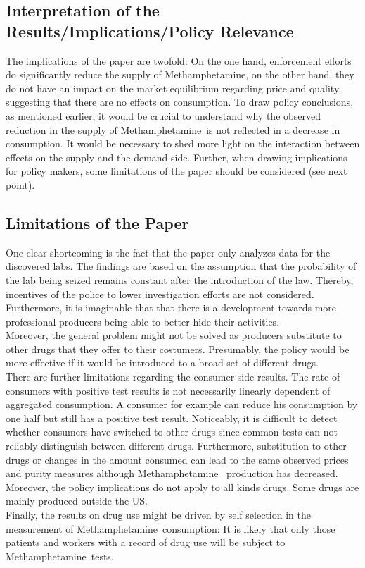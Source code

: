 \documentclass[%
  fontsize=11pt, %
  version=last,%
  headsepline,
  titlepage = false,
  DIV = 11, %
  abstract = false
]{scrartcl}
\newcommand{\meth}{Methamphetamine} %
\begin{document}
\subsection*{Interpretation of the Results/Implications/Policy Relevance}
The implications of the paper are twofold: On the one hand, enforcement efforts do significantly reduce the supply of \meth, on the other hand, they do not have an impact on the market equilibrium regarding price and quality, suggesting that there are no effects on consumption. To draw policy conclusions, as mentioned earlier, it would be crucial to understand why the observed reduction in the supply of \meth~is not reflected in a decrease in consumption. It would be necessary to shed more light on the interaction between effects on the supply and the demand side. Further, when drawing implications for policy makers, some limitations of the paper should be considered (see next point).

\subsection*{Limitations of the Paper}
One clear shortcoming is the fact that the paper only analyzes data for the discovered labs. The findings are based on the assumption that the probability of the lab being seized remains constant after the introduction of the law. Thereby, incentives of the police to lower investigation efforts are not considered. Furthermore, it is imaginable that that there is a development towards more professional producers being able to better hide their activities. \\
Moreover, the general problem might not be solved as producers substitute to other drugs that they offer to their costumers. Presumably, the policy would be more effective if it would be introduced to a broad set of different drugs. \\
There are further limitations regarding the consumer side results. The rate of consumers with positive test results is not necessarily linearly dependent of aggregated consumption. A consumer for example can reduce his consumption by one half but still has a positive test result. Noticeably, it is difficult to detect whether consumers have switched to other drugs since common tests can not reliably distinguish between different drugs. Furthermore, substitution to other drugs or changes in the amount consumed can lead to the same observed prices and purity measures although \meth~ production has decreased. \\
Moreover, the policy implications do not apply to all kinds drugs. Some drugs are mainly produced outside the US. \\
Finally, the results on drug use might be driven by self selection in the measurement of \meth~consumption: It is likely that only those patients and workers with a record of drug use will be subject to \meth~tests. 
\newpage
\end{document}
